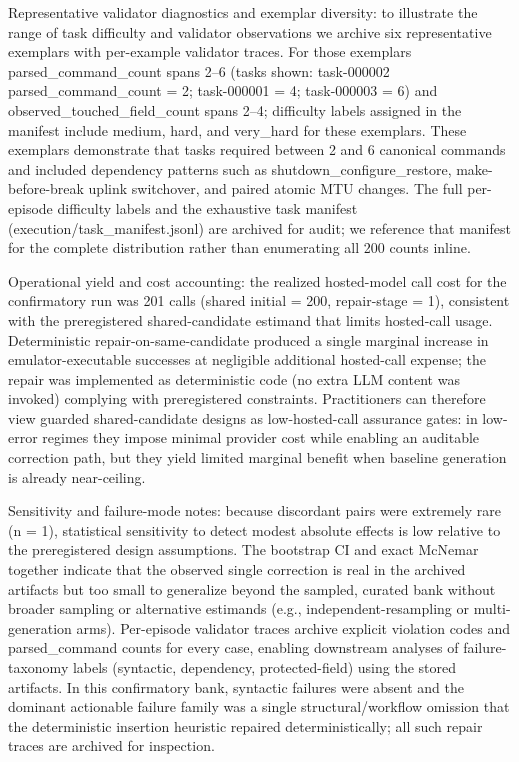 \documentclass[conference]{IEEEtran}
\begin{document}
Representative validator diagnostics and exemplar diversity: to illustrate the range of task difficulty and validator observations we archive six representative exemplars with per-example validator traces. For those exemplars parsed\_command\_count spans 2--6 (tasks shown: task-000002 parsed\_command\_count = 2; task-000001 = 4; task-000003 = 6) and observed\_touched\_field\_count spans 2--4; difficulty labels assigned in the manifest include medium, hard, and very\_hard for these exemplars. These exemplars demonstrate that tasks required between 2 and 6 canonical commands and included dependency patterns such as shutdown\_configure\_restore, make-before-break uplink switchover, and paired atomic MTU changes. The full per-episode difficulty labels and the exhaustive task manifest (execution/task\_manifest.jsonl) are archived for audit; we reference that manifest for the complete distribution rather than enumerating all 200 counts inline.

Operational yield and cost accounting: the realized hosted-model call cost for the confirmatory run was 201 calls (shared initial = 200, repair-stage = 1), consistent with the preregistered shared-candidate estimand that limits hosted-call usage. Deterministic repair-on-same-candidate produced a single marginal increase in emulator-executable successes at negligible additional hosted-call expense; the repair was implemented as deterministic code (no extra LLM content was invoked) complying with preregistered constraints. Practitioners can therefore view guarded shared-candidate designs as low-hosted-call assurance gates: in low-error regimes they impose minimal provider cost while enabling an auditable correction path, but they yield limited marginal benefit when baseline generation is already near-ceiling.

Sensitivity and failure-mode notes: because discordant pairs were extremely rare (n = 1), statistical sensitivity to detect modest absolute effects is low relative to the preregistered design assumptions. The bootstrap CI and exact McNemar together indicate that the observed single correction is real in the archived artifacts but too small to generalize beyond the sampled, curated bank without broader sampling or alternative estimands (e.g., independent-resampling or multi-generation arms). Per-episode validator traces archive explicit violation codes and parsed\_command counts for every case, enabling downstream analyses of failure-taxonomy labels (syntactic, dependency, protected-field) using the stored artifacts. In this confirmatory bank, syntactic failures were absent and the dominant actionable failure family was a single structural/workflow omission that the deterministic insertion heuristic repaired deterministically; all such repair traces are archived for inspection.
\end{document}
